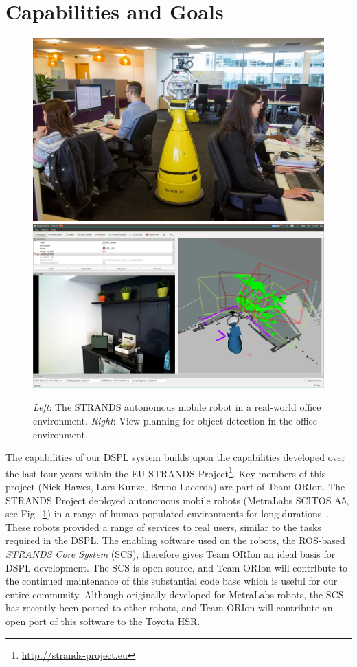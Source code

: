 \documentclass[runningheads,a4paper]{llncs}
\newcommand{\teamori}{Team ORIon}
\begin{document}
\section{Capabilities and Goals}

\begin{figure}[tb]
  \begin{center}
    \includegraphics[width=.43\columnwidth]{images/betty.jpg}
    \includegraphics[width=.55\columnwidth,clip,trim=10ex 20ex 10ex 20ex]{images/viewplanning_at_tsc.png}
  \end{center} 
  \vspace{-10pt}  
  \caption{\textit{Left}: The STRANDS autonomous mobile robot in a real-world
  office environment. \textit{Right}: View planning for object detection in the
  office environment.}
  \label{fig:mk}
  \vspace{-3ex}
\end{figure}

The capabilities of our DSPL system builds upon the capabilities developed over the last four years within the EU STRANDS Project\footnote{\url{http://strands-project.eu}}. Key members of this project (Nick Hawes, Lars Kunze, Bruno Lacerda) are part of \teamori. The STRANDS Project deployed autonomous mobile robots (MetraLabs SCITOS A5, see Fig.~\ref{fig:mk}) in a range of human-populated environments for long durations~\cite{strands@ram}. These robots provided a range of services to real users, similar to the tasks required in the DSPL. The enabling software used on the robots, the ROS-based \emph{STRANDS Core System} (SCS), therefore gives \teamori{} an ideal basis for DSPL development. The SCS is open source, and \teamori{} will contribute to the continued maintenance of this substantial code base which is useful for our entire community. Although originally developed for MetraLabs robots, the SCS has recently been ported to other robots, and \teamori{} will contribute an open port of this software to the Toyota HSR. 
\end{document}
